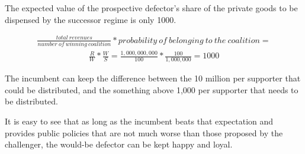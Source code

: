 The expected value of the prospective defector’s share of the private goods to be dispensed by the successor regime is only 1000.

\begin{align*}
    \frac{total\ revenues}{number\ of\ winning\ coalition}* probability\ of\ belonging\ to\ the\ coalition =
\end{align*}
\begin{align*}
    \frac{R}{W} * \frac{W}{S} = \frac{1,000,000,000}{100} * \frac{100}{1,000,000} = 1000
\end{align*}

The incumbent can keep the difference between the 10 million per supporter that could be distributed, and the something above 1,000 per supporter that needs to be distributed.

It is easy to see that as long as the incumbent beats that expectation and provides public policies that are not much worse than those proposed by the challenger, the would-be defector can be kept happy and loyal.